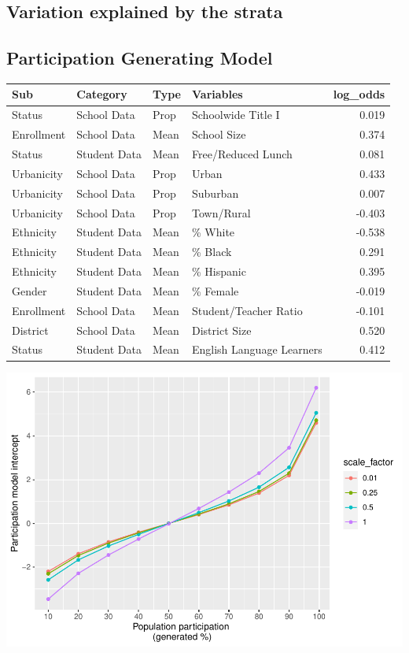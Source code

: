 \documentclass[
  english,
  man,floatsintext]{apa6}
\begin{document}
\hypertarget{variation-explained-by-the-strata}{%
\subsection{Variation explained by the strata}\label{variation-explained-by-the-strata}}

\hypertarget{participation-generating-model}{%
\subsection{Participation Generating Model}\label{participation-generating-model}}

\begin{table}
\centering
\begin{tabular}{l|l|l|l|r}
\hline
Sub & Category & Type & Variables & log\_odds\\
\hline
Status & School Data & Prop & Schoolwide Title I & 0.019\\
\hline
Enrollment & School Data & Mean & School Size & 0.374\\
\hline
Status & Student Data & Mean & Free/Reduced Lunch & 0.081\\
\hline
Urbanicity & School Data & Prop & Urban & 0.433\\
\hline
Urbanicity & School Data & Prop & Suburban & 0.007\\
\hline
Urbanicity & School Data & Prop & Town/Rural & -0.403\\
\hline
Ethnicity & Student Data & Mean & \% White & -0.538\\
\hline
Ethnicity & Student Data & Mean & \% Black & 0.291\\
\hline
Ethnicity & Student Data & Mean & \% Hispanic & 0.395\\
\hline
Gender & Student Data & Mean & \% Female & -0.019\\
\hline
Enrollment & School Data & Mean & Student/Teacher Ratio & -0.101\\
\hline
District & School Data & Mean & District Size & 0.520\\
\hline
Status & Student Data & Mean & English Language Learners & 0.412\\
\hline
\end{tabular}
\end{table}

\includegraphics{5---Analysis_files/figure-latex/unnamed-chunk-12-1.pdf}
\end{document}
